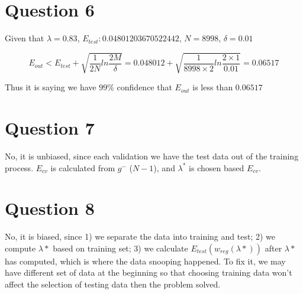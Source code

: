 \documentclass{article}
\def\math#1{$#1$}
\begin{document}
\section{Question 6} 

Given that \math{\lambda = 0.83}, \math{E_{test}: 0.04801203670522442}, \math{N = 8998}, \math{\delta = 0.01}

\begin{equation}
    E_{out} < E_{test} + \sqrt{\frac{1}{2N} ln\frac{2M}{\delta}} = 0.048012 + \sqrt{\frac{1}{8998 \times 2}ln\frac{2 \times 1}{0.01}} = 0.06517
\end{equation}

Thus it is saying we have \math{99\%} confidence that \math{E_{out}} is less than \math{0.06517} 

\section{Question 7}

No, it is unbiased, since each validation we have the test data out of the training process. \math{E_{cv}} is calculated from \math{g^-} (\math{N - 1}), and \math{\lambda^*} is chosen based \math{E_{cv}}.


\section{Question 8}

No, it is biased, since 1) we separate the data into training and test; 2) we compute \math{\lambda*} based on training set; 3) we calculate \math{E_{test}(w_{reg}(\lambda*))} after \math{\lambda*} has computed, which is where the data snooping happened. To fix it, we may have different set of data at the beginning so that choosing training data won't affect the selection of testing data then the problem solved.
\end{document}

